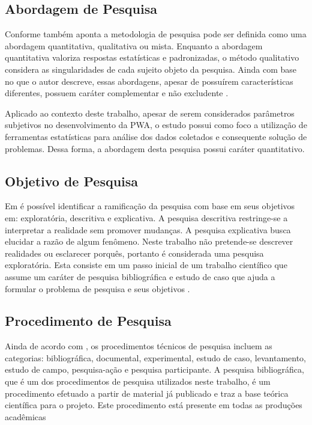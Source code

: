 \subsection{Abordagem de Pesquisa}
Conforme também aponta  a metodologia de pesquisa pode ser definida como uma abordagem quantitativa, qualitativa ou mista. Enquanto a abordagem quantitativa valoriza respostas estatísticas e padronizadas, o método qualitativo considera as singularidades de cada sujeito objeto da pesquisa. Ainda com base no que o autor descreve, essas abordagens, apesar de possuírem características diferentes, possuem caráter complementar e não excludente \cite{nascimento2016classificaccao}. 

Aplicado ao contexto deste trabalho, apesar de serem considerados parâmetros subjetivos no desenvolvimento da PWA, o estudo possui como foco a utilização de ferramentas estatísticas para análise dos dados coletados e consequente solução de problemas. Dessa forma, a abordagem desta pesquisa possui caráter quantitativo.

\subsection{Objetivo de Pesquisa}
Em  é possível identificar a ramificação da pesquisa com base em seus objetivos em: exploratória, descritiva e explicativa. A pesquisa descritiva restringe-se a interpretar a realidade sem promover mudanças. A pesquisa explicativa busca elucidar a razão de algum fenômeno. Neste trabalho não pretende-se descrever realidades ou esclarecer porquês, portanto é considerada uma pesquisa exploratória. Esta consiste em um passo inicial de um trabalho científico que assume um caráter de pesquisa bibliográfica e estudo de caso que ajuda a formular o problema de pesquisa e seus objetivos \cite{silveira2011metodologia}. 

\subsection{Procedimento de Pesquisa}
Ainda de acordo com , os procedimentos técnicos de pesquisa incluem as categorias: bibliográfica, documental, experimental, estudo de caso, levantamento, estudo de campo, pesquisa-ação e pesquisa participante. A pesquisa bibliográfica, que é um dos procedimentos de pesquisa utilizados neste trabalho, é um procedimento efetuado a partir de material já publicado e traz a base teórica científica para o projeto. Este procedimento está presente em todas as produções acadêmicas

